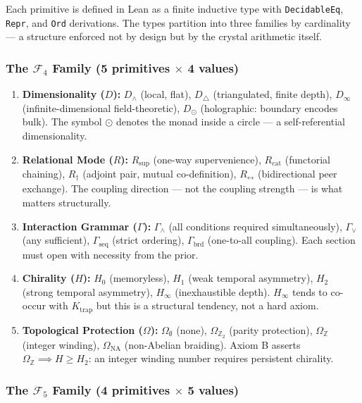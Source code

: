 \documentclass[12pt,a4paper]{article}
\begin{document}
Each primitive is defined in Lean as a finite inductive type with \texttt{DecidableEq}, \texttt{Repr}, and \texttt{Ord} derivations. The types partition into three families by cardinality --- a structure enforced not by design but by the crystal arithmetic itself.

\subsubsection{The $\mathcal{F}_4$ Family (5 primitives $\times$ 4 values)}

\begin{enumerate}
    \item \textbf{Dimensionality ($D$):} $D_{\wedge}$ (local, flat), $D_{\triangle}$ (triangulated, finite depth), $D_{\infty}$ (infinite-dimensional field-theoretic), $D_{\odot}$ (holographic: boundary encodes bulk). The symbol $\odot$ denotes the monad inside a circle --- a self-referential dimensionality.
    \item \textbf{Relational Mode ($R$):} $R_\text{sup}$ (one-way supervenience), $R_\text{cat}$ (functorial chaining), $R_{\dagger}$ (adjoint pair, mutual co-definition), $R_{\leftrightarrow}$ (bidirectional peer exchange). The coupling direction --- not the coupling strength --- is what matters structurally.
    \item \textbf{Interaction Grammar ($\Gamma$):} $\Gamma_{\wedge}$ (all conditions required simultaneously), $\Gamma_{\vee}$ (any sufficient), $\Gamma_\text{seq}$ (strict ordering), $\Gamma_\text{brd}$ (one-to-all coupling). Each section must open with necessity from the prior.
    \item \textbf{Chirality ($H$):} $H_0$ (memoryless), $H_1$ (weak temporal asymmetry), $H_2$ (strong temporal asymmetry), $H_{\infty}$ (inexhaustible depth). $H_{\infty}$ tends to co-occur with $K_\text{trap}$ but this is a structural tendency, not a hard axiom.
    \item \textbf{Topological Protection ($\Omega$):} $\Omega_{\emptyset}$ (none), $\Omega_{\mathbb{Z}_2}$ (parity protection), $\Omega_\mathbb{Z}$ (integer winding), $\Omega_\text{NA}$ (non-Abelian braiding). Axiom B asserts $\Omega_\mathbb{Z} \implies H \geq H_2$: an integer winding number requires persistent chirality.
\end{enumerate}

\subsubsection{The $\mathcal{F}_5$ Family (4 primitives $\times$ 5 values)}
\end{document}

